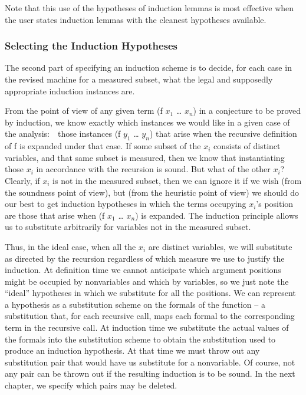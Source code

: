 \documentclass[10pt]{book}
\begin{document}
Note that this use of the hypotheses of induction lemmas is most effective
when the user states induction lemmas with the
cleanest hypotheses available.

\subsubsection{Selecting the Induction Hypotheses}
The second part of specifying an induction scheme is to decide, for
each case in the revised machine for a measured subset, what the
legal and supposedly appropriate induction instances are.

From the point of view of any given term (f $x_{1}$ \ldots{} $x_{n}$)
in a conjecture to be proved by induction, we know exactly which instances
we would like in a given case of the analysis:~~those instances
(f $y_{1}$ \ldots{} $y_{n}$) that arise when the recursive definition of f is expanded
under that case.  If some subset of the $x_{i}$ consists of distinct
variables, and that same subset is measured,
then we know that instantiating those $x_{i}$
in accordance with the recursion is sound.  But what of the other $x_{i}$?
Clearly, if $x_{i}$ is not in the measured subset, then we can ignore it
if we wish (from the soundness point of view), but (from the heuristic
point of view) we should do our
best to get induction hypotheses in which the terms occupying $x_{i}$'s
position are those that arise when (f $x_{1}$ \ldots{} $x_{n}$) is
expanded.
The induction principle allows us to substitute arbitrarily for variables
not in the measured subset.

Thus, in the ideal case, when all the $x_{i}$  are distinct variables, we will
substitute as directed by the recursion regardless of which measure
we use to justify the induction.  At definition time we cannot
anticipate which argument positions might be occupied by nonvariables and which
by variables, so we just note the ``ideal'' hypotheses in which we
substitute for all the positions.  We can represent a hypothesis
as a substitution scheme on the formals of the function -- a substitution
that, for each recursive call, maps each formal to the corresponding term in the
recursive call.  At induction time we substitute
the actual values of the formals into the substitution scheme to obtain
the substitution used to produce an induction hypothesis.
At that time we must throw out any substitution pair that
would have us substitute for a nonvariable.  Of course, not any
pair can be thrown out if the resulting induction is to be sound.  In the next chapter,
we specify which pairs may be deleted.
\end{document}
